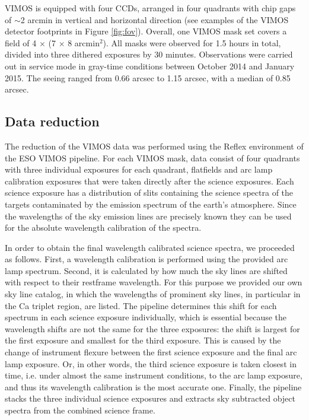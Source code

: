 \documentclass[useAMS,usenatbib]{mn2e}
\begin{document}
VIMOS is equipped with four CCDs, arranged in four quadrants with chip gaps of $\sim$2 arcmin in vertical and horizontal direction (see examples of the VIMOS detector footprints in Figure \ref{fig:fov}). Overall, one VIMOS mask set covers a field of 4 $\times$ (7 $\times$ 8 arcmin$^2$). All masks were observed for 1.5 hours in total, divided into three dithered exposures by 30 minutes. Observations were carried out in service mode in gray-time conditions between October 2014 and January 2015. The seeing ranged from 0.66 arcsec to 1.15 arcsec, with a median of 0.85 arcsec. 

\subsection{Data reduction}

The reduction of the VIMOS data was performed using the Reflex 
environment \citep{Freudling13} of the ESO VIMOS pipeline. 
For each VIMOS mask, data consist of four 
quadrants with three individual exposures for each quadrant, flatfields and
arc lamp calibration exposures that were taken directly after the science 
exposures. Each science exposure has a distribution of slits containing the 
science spectra of the targets contaminated by the emission spectrum of the 
earth's atmosphere. Since the wavelengths of the sky emission lines are 
precisely known they can be used for the absolute wavelength calibration of 
the spectra.

In order to obtain the final wavelength calibrated science spectra, we 
proceeded as follows. First, a wavelength calibration 
is performed using the provided arc lamp spectrum. Second, it is calculated
by how much the sky lines are shifted with respect to their restframe 
wavelength. For this purpose we provided our own sky line catalog, in which 
the wavelengths of prominent sky lines, in particular in the Ca triplet 
region, are listed. The pipeline determines this shift for each spectrum in 
each science exposure individually, which is essential because the wavelength 
shifts are not the same for the three exposures: the shift is largest for the 
first exposure and smallest for the third exposure. This is caused by the 
change of instrument flexure between the first science exposure and the final 
arc lamp exposure. Or, in other words, the third science exposure is taken 
closest in time, i.e. under almost the same instrument conditions, to the arc 
lamp exposure, and thus its wavelength calibration is the most accurate one. 
Finally, the pipeline stacks the three individual science exposures and 
extracts sky subtracted object spectra from the combined science frame.
\end{document}
